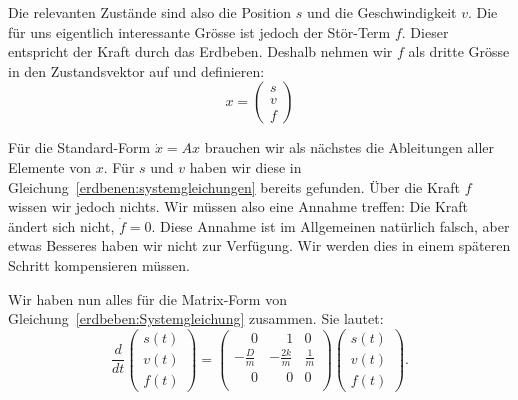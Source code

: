 Die relevanten Zustände sind also die Position $s$ und die Geschwindigkeit $v$.
Die für uns eigentlich interessante Grösse ist jedoch der Stör-Term $f$.
Dieser entspricht der Kraft durch das Erdbeben.
Deshalb nehmen wir $f$ als dritte Grösse in den Zustandsvektor auf und definieren:
\[ 
  x = \begin{pmatrix} {s} \\ {v} \\ {f} \end{pmatrix}
\] 
  
Für die Standard-Form $\dot x = Ax$ brauchen wir als nächstes die Ableitungen aller Elemente von $x$.
Für $s$ und $v$  haben wir diese in Gleichung~\eqref{erdbenen:systemgleichungen} bereits gefunden.
Über die Kraft $f$ wissen wir jedoch nichts.
Wir müssen also eine Annahme treffen: Die Kraft ändert sich nicht, $\dot f = 0$.
Diese Annahme ist im Allgemeinen natürlich falsch, aber etwas Besseres haben wir nicht zur Verfügung.
Wir werden dies in einem späteren Schritt kompensieren müssen.

Wir haben nun alles für die Matrix-Form von Gleichung~\eqref{erdbeben:Systemgleichung} zusammen.
Sie lautet:
\begin{equation}
  \frac{d}{dt} \begin{pmatrix} s(t) \\ v(t) \\ f(t) \end{pmatrix}
  =
 \begin{pmatrix}
  \phantom- 0 & \phantom-1& 0 \\ 
  - \frac{D}{m} &-\frac{2k}{m} & \frac{1} {m} \\
  \phantom-0 & \phantom-0 & 0\\
  \end{pmatrix}
  \begin{pmatrix} s(t) \\ v(t) \\ f(t) \end{pmatrix}.
  \label{erdbeben:systemmatrix}
\end{equation}

